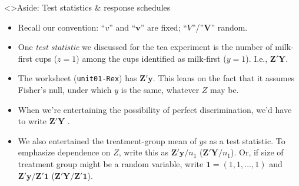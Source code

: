 \begin{frame}<\nottheirhandout>{Aside: Test statistics \& response schedules}
  
\begin{itemize}
\item Recall our convention: ``$v$'' and ``$\mathbf{v}$'' are fixed; ``$V$''/''$\mathbf{V}$'' random. 
\item One \textit{test statistic} we discussed for the tea experiment
  is the number of milk-first cups ($z=1$) among the cups identified as
  milk-first ($y=1$). I.e., $\mathbf{Z}'\mathbf{Y}$. \pause


\item The worksheet (\texttt{unit01-Rex}) has $\mathbf{Z}'\mathbf{y}$.  This leans on the fact that it assumes Fisher's null, under which $y$ is the same, whatever $Z$ may be. \pause

\item When we're entertaining the possibility of perfect discrimination, we'd have to write $\mathbf{Z}'\mathbf{Y}$ .
\item We also entertained the treatment-group mean of $y$s as a test
  statistic. To emphasize dependence on $Z$, write this as $\mathbf{Z}'\mathbf{y}/n_{1}$
  ($\mathbf{Z}'\mathbf{Y}/n_{1}$). Or, if size of treatment group might be a random
  variable, write $\mathbf{1} = (1, 1, \ldots, 1)$ and $\mathbf{Z}'\mathbf{y}/\mathbf{Z}'\mathbf{1}$  ($\mathbf{Z}'\mathbf{Y}/\mathbf{Z}'\mathbf{1}$).
\end{itemize}
\end{frame}


